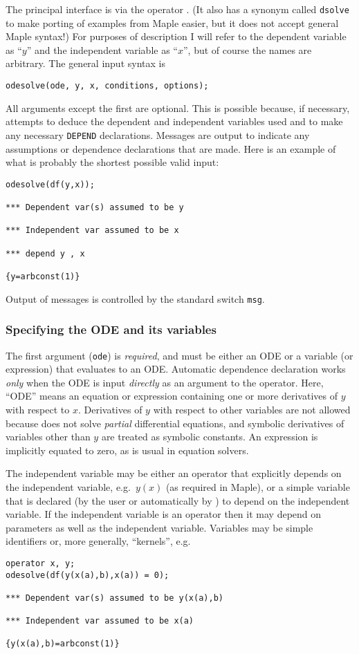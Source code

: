 The principal interface is via the operator \odesolve{}.  (It also has
a synonym called \texttt{dsolve} to make porting of examples from
Maple easier, but it does not accept general Maple syntax!)  For
purposes of description I will refer to the dependent variable as
``$y$'' and the independent variable as ``$x$'', but of course the
names are arbitrary.  The general input syntax is
\begin{verbatim}
odesolve(ode, y, x, conditions, options);
\end{verbatim}
All arguments except the first are optional.  This is possible
because, if necessary,  attempts to deduce the dependent
and independent variables used and to make any necessary
\texttt{DEPEND} declarations.  Messages are output to indicate any
assumptions or dependence declarations that are made.  Here is an
example of what is probably the shortest possible valid input:
\begin{verbatim}
odesolve(df(y,x));

*** Dependent var(s) assumed to be y

*** Independent var assumed to be x

*** depend y , x

{y=arbconst(1)}
\end{verbatim}
Output of  messages is controlled by the standard
\REDUCE{} switch \texttt{msg}.


\subsubsection{Specifying the ODE and its variables}

The first argument (\texttt{ode}) is \emph{required}, and must be
either an ODE or a variable (or expression) that evaluates to an
ODE\@.  Automatic dependence declaration works \emph{only} when the
ODE is input \emph{directly} as an argument to the \odesolve{}
operator.  Here, ``ODE'' means an equation or expression containing
one or more derivatives of $y$ with respect to $x$.  Derivatives of
$y$ with respect to other variables are not allowed because
 does not solve \emph{partial} differential equations,
and symbolic derivatives of variables other than $y$ are treated as
symbolic constants.  An expression is implicitly equated to zero, as
is usual in equation solvers.

The independent variable may be either an operator that explicitly
depends on the independent variable, e.g.\ $y(x)$ (as required in
Maple), or a simple variable that is declared (by the user or
automatically by ) to depend on the independent variable.
If the independent variable is an operator then it may depend on
parameters as well as the independent variable.  Variables may be
simple identifiers or, more generally, \REDUCE{} ``kernels'', e.g.
\begin{verbatim}
operator x, y;
odesolve(df(y(x(a),b),x(a)) = 0);

*** Dependent var(s) assumed to be y(x(a),b)

*** Independent var assumed to be x(a)

{y(x(a),b)=arbconst(1)}
\end{verbatim}

